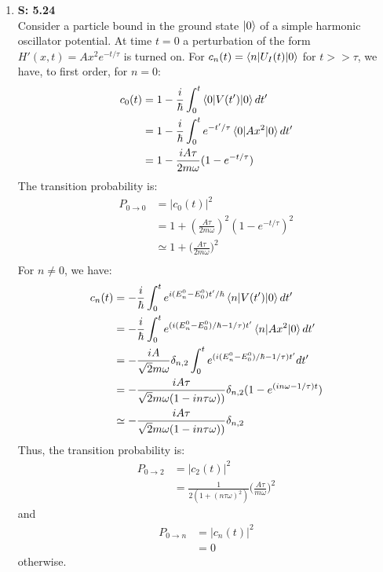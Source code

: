\documentclass[12pt, letterpaper]{article}
\begin{document}
\begin{enumerate}
    \item[] \textbf{S: 5.24}\\
    Consider a particle bound in the ground state $\ket{0}$ of a simple harmonic oscillator potential. At time $t=0$ a perturbation of the form $H'(x,t)=Ax^2e^{-t/\tau}$ is turned on. For $c_n(t)=\braket{n|U_I(t)|0}$ for $t>>\tau$, we have, to first order, for $n=0$:
    \begin{align}
            c_0(t)&=1-\frac{i}{\hbar}\int_0^t\braket{0|V(t')|0}dt'\\
            &=1-\frac{i}{\hbar}\int_0^t e^{-t'/\tau}\braket{0|Ax^2|0}dt'\\
            &=1-\frac{iA\tau}{2m\omega}(1-e^{-t/\tau})
    \end{align}
    The transition probability is:
    \begin{align}
            P_{0\rightarrow 0} &= |c_0(t)|^2\\
            &=1+(\frac{A\tau}{2m\omega})^2(1-e^{-t/\tau})^2\\
            &\simeq1+\Big(\frac{A\tau}{2m\omega}\Big)^2\hspace{2cm}
    \end{align}
\begin{align}
\end{align}
For $n\neq0$, we have: 
\begin{align}
            c_n(t)&=-\frac{i}{\hbar}\int_0^te^{i(E^0_n-E^0_0)t'/\hbar}\braket{n|V(t')|0}dt'\\
            &=-\frac{i}{\hbar}\int_0^te^{(i(E^0_n-E^0_0)/\hbar-1/\tau)t'}\braket{n|Ax^2|0}dt'\\
            &=-\frac{iA}{\sqrt{2}m\omega}\delta_{n,2}\int_0^te^{(i(E^0_n-E^0_0)/\hbar-1/\tau)t'}dt'\\
            &=-\frac{iA\tau}{\sqrt{2}m\omega(1-in\tau\omega))}\delta_{n,2}(1-e^{(in\omega-1/\tau)t})\\
            &\simeq-\frac{iA\tau}{\sqrt{2}m\omega(1-in\tau\omega))}\delta_{n,2}\\
\end{align}
Thus, the transition probability is:
\begin{align}
      P_{0\rightarrow 2} &= |c_2(t)|^2\\
            &= \frac{1}{2(1+(n\tau\omega)^2)}\Big(\frac{A\tau}{m\omega}\Big)^2
\end{align}
and
\begin{align}
      P_{0\rightarrow n} &= |c_n(t)|^2\\
            &= 0
\end{align}
otherwise.


\end{enumerate}
\end{document}
